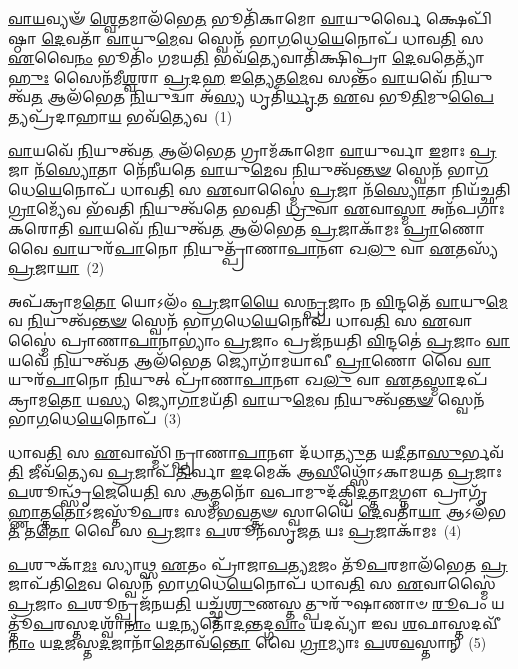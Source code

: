 \setcounter{anuvakam}{0}
\-\ul{𑌵𑌾}\-\-\ul{𑌯}\-𑌵𑍍𑌯𑍟᳴ \ul{𑌶𑍍𑌵𑍇}\-𑌤𑌮𑌾\-𑌲᳴𑌭𑍇\-\ul{𑌤} 𑌭𑍂𑌤𑌿᳴𑌕𑌾𑌮𑍋 \ul{𑌵𑌾}\-𑌯𑍁𑌰𑍍𑌵𑍈 𑌕𑍍𑌷𑍇𑌪𑌿᳴𑌷𑍍𑌠𑌾 \ul{𑌦𑍇}\-𑌵𑌤𑌾᳴ \ul{𑌵𑌾}\-𑌯𑍁\-\ul{𑌮𑍇}\-𑌵 𑌸𑍍𑌵𑍇𑌨᳴ 𑌭𑌾\-\ul{𑌗}\-𑌧𑍇\-\ul{𑌯𑍇}\-𑌨𑍋𑌪᳴ 𑌧𑌾𑌵\-\ul{𑌤𑌿} 𑌸 \ul{𑌏}\-𑌵𑍈\-\ul{𑌨𑌂} 𑌭𑍂𑌤𑌿𑌂᳴ 𑌗𑌮𑌯\-\ul{𑌤𑌿} 𑌭𑌵᳴\-\ul{𑌤𑍍𑌯𑍇}\-𑌵𑌾𑌤𑌿᳴𑌕𑍍𑌷𑌿𑌪𑍍𑌰𑌾 \ul{𑌦𑍇}\-𑌵𑌤𑍇𑌤𑍍𑌯𑌾᳴\-\ul{𑌹𑍁𑌃} 𑌸𑍈𑌨᳴𑌮𑍀\-\ul{𑌶𑍍𑌵}\-𑌰𑌾 \ul{𑌪𑍍𑌰}\-𑌦\-\ul{𑌹} 𑌇\-\ul{𑌤𑍍𑌯𑍇}\-𑌤\-\ul{𑌮𑍇}\-𑌵 𑌸𑌨𑍍𑌤𑌂᳴ \ul{𑌵𑌾}\-𑌯𑌵𑍇᳴ \ul{𑌨𑌿}\-𑌯𑍁𑌤𑍍𑌵᳴\-\ul{𑌤} 𑌆𑌲᳴𑌭𑍇𑌤 \ul{𑌨𑌿}\-𑌯𑍁𑌦𑍍𑌵𑌾 𑌅᳴\-\ul{𑌸𑍍𑌯} 𑌧𑍃𑌤𑌿᳴\-\ul{𑌰𑍍𑌧𑍃}\-𑌤 \ul{𑌏}\-𑌵 𑌭𑍂\-\ul{𑌤𑌿}\-𑌮𑍁\-\ul{𑌪𑍈}\-𑌤𑍍𑌯𑌪𑍍𑌰᳴𑌦𑌾𑌹𑌾\-\ul{𑌯} 𑌭𑌵᳴\-\ul{𑌤𑍍𑌯𑍇}\-𑌵~(1)

\-\ul{𑌵𑌾}\-𑌯𑌵𑍇᳴ \ul{𑌨𑌿}\-𑌯𑍁𑌤𑍍𑌵᳴\-\ul{𑌤} 𑌆\-𑌲᳴𑌭𑍇\-\ul{𑌤} 𑌗𑍍𑌰𑌾𑌮᳴𑌕𑌾𑌮𑍋 \ul{𑌵𑌾}\-𑌯𑍁𑌰𑍍𑌵𑌾 \ul{𑌇}\-𑌮𑌾𑌃 \ul{𑌪𑍍𑌰}\-𑌜𑌾 𑌨᳴\-\ul{𑌸𑍍𑌯𑍋}\-𑌤𑌾 𑌨𑍇᳴𑌨𑍀𑌯𑌤𑍇 \ul{𑌵𑌾}\-𑌯𑍁\-\ul{𑌮𑍇}\-𑌵 \ul{𑌨𑌿}\-𑌯𑍁𑌤𑍍𑌵᳴\-\ul{𑌨𑍍𑌤}\-\-\ul{𑍟} 𑌸𑍍𑌵𑍇𑌨᳴ 𑌭𑌾\-\ul{𑌗}\-𑌧𑍇\-\ul{𑌯𑍇}\-𑌨𑍋𑌪᳴ 𑌧𑌾𑌵\-\ul{𑌤𑌿} 𑌸 \ul{𑌏}\-𑌵𑌾𑌸𑍍𑌮𑍈॑ \ul{𑌪𑍍𑌰}\-𑌜𑌾 𑌨᳴\-\ul{𑌸𑍍𑌯𑍋}\-𑌤𑌾 𑌨𑌿𑌯᳴𑌚𑍍𑌛𑌤𑌿 \ul{𑌗𑍍𑌰𑌾}\-𑌮𑍍𑌯𑍇᳴𑌵 𑌭᳴𑌵𑌤𑌿 \ul{𑌨𑌿}\-𑌯𑍁𑌤𑍍𑌵᳴𑌤𑍇 𑌭𑌵𑌤𑌿 \ul{𑌧𑍍𑌰𑍁}\-𑌵𑌾 \ul{𑌏}\-𑌵𑌾\-\ul{𑌸𑍍𑌮𑌾} 𑌅𑌨᳴𑌪𑌗𑌾𑌃 𑌕𑌰𑍋𑌤𑌿 \ul{𑌵𑌾}\-𑌯𑌵𑍇᳴ \ul{𑌨𑌿}\-𑌯𑍁𑌤𑍍𑌵᳴\-\ul{𑌤} 𑌆𑌲᳴𑌭𑍇𑌤 \ul{𑌪𑍍𑌰}\-𑌜𑌾𑌕𑌾᳴𑌮𑌃 \ul{𑌪𑍍𑌰𑌾}\-𑌣𑍋 𑌵𑍈 \ul{𑌵𑌾}\-𑌯𑍁𑌰᳴\-\ul{𑌪𑌾}\-𑌨𑍋 \ul{𑌨𑌿}\-𑌯𑍁𑌤𑍍𑌪𑍍𑌰𑌾᳴𑌣𑌾\-\ul{𑌪𑌾}\-𑌨𑍗 𑌖\-\ul{𑌲𑍁} 𑌵𑌾 \ul{𑌏}\-𑌤𑌸𑍍𑌯᳴ \ul{𑌪𑍍𑌰}\-𑌜𑌾\-\ul{𑌯𑌾}\-~(2)

𑌅𑌪᳴𑌕𑍍𑌰𑌾𑌮\-\ul{𑌤𑍋} 𑌯𑍋\-𑌽𑌲𑌂᳴ \ul{𑌪𑍍𑌰}\-𑌜𑌾\-\ul{𑌯𑍈} 𑌸\-\ul{𑌨𑍍𑌪𑍍𑌰}\-𑌜𑌾𑌂 𑌨 \ul{𑌵𑌿}\-𑌨𑍍𑌦𑌤𑍇᳴ \ul{𑌵𑌾}\-𑌯𑍁\-\ul{𑌮𑍇}\-𑌵 \ul{𑌨𑌿}\-𑌯𑍁𑌤𑍍𑌵᳴\-\ul{𑌨𑍍𑌤}\-\-\ul{𑍟} 𑌸𑍍𑌵𑍇𑌨᳴ 𑌭𑌾\-\ul{𑌗}\-𑌧𑍇\-\ul{𑌯𑍇}\-𑌨𑍋𑌪᳴ 𑌧𑌾𑌵\-\ul{𑌤𑌿} 𑌸 \ul{𑌏}\-𑌵𑌾𑌸𑍍𑌮𑍈॑ 𑌪𑍍𑌰𑌾𑌣𑌾\-\ul{𑌪𑌾}\-𑌨𑌾\-𑌭𑍍𑌯𑌾𑌂॑ \ul{𑌪𑍍𑌰}\-𑌜𑌾𑌂 𑌪𑍍𑌰𑌜᳴𑌨𑌯𑌤𑌿 \ul{𑌵𑌿}\-𑌨𑍍𑌦𑌤𑍇॑ \ul{𑌪𑍍𑌰}\-𑌜𑌾𑌂 \ul{𑌵𑌾}\-𑌯𑌵𑍇᳴ \ul{𑌨𑌿}\-𑌯𑍁𑌤𑍍𑌵᳴\-\ul{𑌤} 𑌆\-𑌲᳴𑌭𑍇\-\ul{𑌤} 𑌜𑍍𑌯𑍋𑌗𑌾᳴𑌮𑌯𑌾𑌵𑍀 \ul{𑌪𑍍𑌰𑌾}\-𑌣𑍋 𑌵𑍈 \ul{𑌵𑌾}\-𑌯𑍁𑌰᳴\-\ul{𑌪𑌾}\-𑌨𑍋 \ul{𑌨𑌿}\-𑌯𑍁𑌤𑍍 𑌪𑍍𑌰𑌾᳴𑌣𑌾\-\ul{𑌪𑌾}\-𑌨𑍗 𑌖\-\ul{𑌲𑍁} 𑌵𑌾 \ul{𑌏}\-𑌤\-\ul{𑌸𑍍𑌮𑌾}\-𑌦𑌪᳴𑌕𑍍𑌰𑌾𑌮\-\ul{𑌤𑍋} 𑌯\-\ul{𑌸𑍍𑌯} 𑌜𑍍𑌯𑍋\-\ul{𑌗𑌾}\-𑌮𑌯᳴𑌤𑌿 \ul{𑌵𑌾}\-𑌯𑍁\-\ul{𑌮𑍇}\-𑌵 \ul{𑌨𑌿}\-𑌯𑍁𑌤𑍍𑌵᳴\-\ul{𑌨𑍍𑌤}\-\-\ul{𑍟} 𑌸𑍍𑌵𑍇𑌨᳴ 𑌭𑌾\-\ul{𑌗}\-𑌧𑍇\-\ul{𑌯𑍇}\-𑌨𑍋𑌪᳴~(3)

𑌧𑌾𑌵\-\ul{𑌤𑌿} 𑌸 \ul{𑌏}\-𑌵𑌾𑌸𑍍𑌮𑌿᳴𑌨𑍍𑌪𑍍𑌰𑌾𑌣𑌾\-\ul{𑌪𑌾}\-𑌨𑍗 𑌦᳴𑌧𑌾\-\ul{𑌤𑍍𑌯𑍁}\-𑌤 𑌯\-\ul{𑌦𑍀}\-𑌤𑌾\-\ul{𑌸𑍁}\-𑌰𑍍𑌭𑌵᳴\-\ul{𑌤𑌿} 𑌜𑍀𑌵᳴\-\ul{𑌤𑍍𑌯𑍇}\-𑌵 \ul{𑌪𑍍𑌰}\-𑌜𑌾𑌪᳴\-\ul{𑌤𑌿}\-𑌰𑍍𑌵𑌾 \ul{𑌇}\-𑌦𑌮𑍇𑌕᳴ 𑌆\-\ul{𑌸𑍀}\-𑌥𑍍𑌸𑍋᳴\-𑌽𑌕𑌾𑌮𑌯𑌤 \ul{𑌪𑍍𑌰}\-𑌜𑌾𑌃 \ul{𑌪}\-𑌶𑍂𑌨𑍍𑌥𑍍𑌸𑍃᳴\-\ul{𑌜𑍇}\-𑌯𑍇\-\ul{𑌤𑌿} 𑌸 \ul{𑌆}\-𑌤𑍍𑌮𑌨𑍋᳴ \ul{𑌵}\-𑌪𑌾𑌮𑍁𑌦᳴𑌕𑍍𑌖𑌿\-\ul{𑌦}\-𑌤𑍍𑌤𑌾\-\ul{𑌮}\-𑌗𑍍𑌨𑍗 𑌪𑍍𑌰𑌾𑌗𑍃᳴\-\ul{𑌹𑍍𑌣𑌾}\-𑌤𑍍𑌤\-\ul{𑌤𑍋}\-\-𑌽𑌜𑌸𑍍𑌤𑍂᳴\-\ul{𑌪}\-𑌰𑌃 𑌸𑌮᳴𑌭\-\ul{𑌵}\-𑌤𑍍𑌤𑍟 𑌸𑍍𑌵𑌾𑌯𑍈᳴ \ul{𑌦𑍇}\-𑌵𑌤𑌾᳴\-\ul{𑌯𑌾} 𑌆\-𑌽𑌲᳴𑌭\-\ul{𑌤} 𑌤\-\ul{𑌤𑍋} 𑌵𑍈 𑌸 \ul{𑌪𑍍𑌰}\-𑌜𑌾𑌃 \ul{𑌪}\-𑌶𑍂𑌨᳴𑌸𑍃𑌜\-\ul{𑌤} 𑌯𑌃 \ul{𑌪𑍍𑌰}\-𑌜𑌾𑌕𑌾᳴𑌮𑌃~(4)

\-\ul{𑌪}\-𑌶𑍁𑌕𑌾᳴\-\ul{𑌮𑌃} 𑌸𑍍𑌯𑌾𑌥𑍍𑌸 \ul{𑌏}\-𑌤𑌂 𑌪𑍍𑌰𑌾᳴𑌜𑌾\-\ul{𑌪}\-𑌤𑍍𑌯\-\ul{𑌮}\-𑌜𑌂 𑌤𑍂᳴\-\ul{𑌪}\-𑌰𑌮𑌾𑌲᳴𑌭𑍇𑌤 \ul{𑌪𑍍𑌰}\-𑌜𑌾𑌪᳴𑌤𑌿\-\ul{𑌮𑍇}\-𑌵 𑌸𑍍𑌵𑍇𑌨᳴ 𑌭𑌾\-\ul{𑌗}\-𑌧𑍇\-\ul{𑌯𑍇}\-𑌨𑍋𑌪᳴ 𑌧𑌾𑌵\-\ul{𑌤𑌿} 𑌸 \ul{𑌏}\-𑌵𑌾𑌸𑍍𑌮𑍈॑ \ul{𑌪𑍍𑌰}\-𑌜𑌾𑌂 \ul{𑌪}\-𑌶𑍂𑌨𑍍𑌪𑍍𑌰𑌜᳴𑌨𑌯\-\ul{𑌤𑌿} 𑌯𑌚𑍍𑌛𑍍𑌮᳴\-\ul{𑌶𑍍𑌰𑍁}\-𑌣𑌸𑍍𑌤𑌤𑍍𑌪𑍁𑌰𑍁᳴𑌷𑌾𑌣𑌾𑍞 \ul{𑌰𑍂}\-𑌪𑌂 𑌯𑌤𑍍𑌤𑍂᳴\-\ul{𑌪}\-𑌰𑌸𑍍𑌤𑌦𑌶𑍍𑌵𑌾᳴\-\ul{𑌨𑌾𑌂} 𑌯\-\ul{𑌦}\-𑌨𑍍𑌯𑌤𑍋᳴\-\ul{𑌦}\-𑌨𑍍𑌤𑌦𑍍𑌗\-\ul{𑌵𑌾𑌂} 𑌯𑌦𑌵𑍍𑌯𑌾᳴ 𑌇𑌵 \ul{𑌶}\-𑌫𑌾𑌸𑍍𑌤𑌦𑌵𑍀᳴\-\ul{𑌨𑌾𑌂} 𑌯\-\ul{𑌦}\-𑌜\-𑌸𑍍𑌤\-\ul{𑌦}\-𑌜𑌾𑌨𑌾᳴\-\ul{𑌮𑍇}\-𑌤𑌾𑌵᳴\-\ul{𑌨𑍍𑌤𑍋} 𑌵𑍈 \ul{𑌗𑍍𑌰𑌾}\-𑌮𑍍𑌯𑌾𑌃 \ul{𑌪}\-𑌶\-\ul{𑌵}\-𑌸𑍍𑌤𑌾𑌨𑍍~(5)

